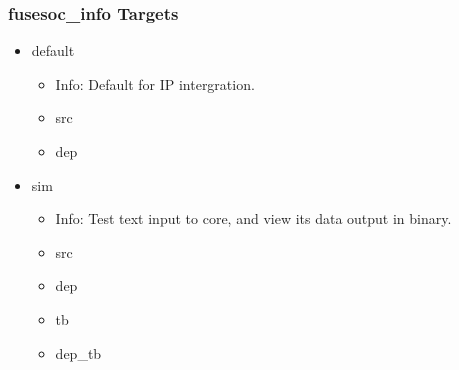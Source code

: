\subsubsection{fusesoc\_info Targets}
\begin{itemize}
\item default
	\begin{itemize}
	\item[$\space$] Info: Default for IP intergration.
	\item src
	\item dep
	\end{itemize}
\item sim
	\begin{itemize}
	\item[$\space$] Info: Test text input to core, and view its data output in binary.
	\item src
	\item dep
	\item tb
	\item dep\_tb
	\end{itemize}
\end{itemize}
